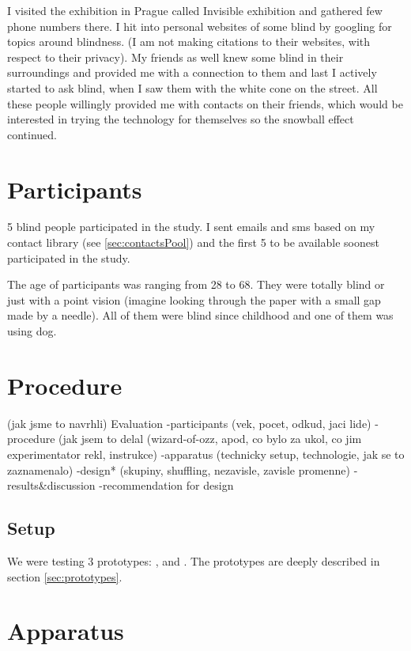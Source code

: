 \documentclass[11pt,oneside,a4paper]{book}
\begin{document}
	I visited the exhibition in Prague called Invisible exhibition \cite{later} and gathered few phone numbers there. I hit into personal websites of some blind by googling for topics around blindness. (I am not making citations to their websites, with respect to their privacy). My friends as well knew some blind in their surroundings and provided me with a connection to them and last I actively started to ask blind, when I saw them with the white cone on the street. All these people willingly provided me with contacts on their friends, which would be interested in trying the technology for themselves so the snowball effect continued.
	\section{Participants}
	
	5 blind people participated in the study. I sent emails and sms based on my contact library (see \ref{sec:contactsPool}) and the first 5 to be available soonest participated in the study. 
	
	The age of participants was ranging from 28 to 68.
	They were totally blind or just with a point vision (imagine looking through the paper with a small gap made by a needle).
	All of them were blind since childhood and one of them was using dog.
	\section{Procedure}
	(jak jsme to navrhli)
	Evaluation
	-participants (vek, pocet, odkud, jaci lide)
	-procedure (jak jsem to delal (wizard-of-ozz, apod, co bylo za ukol, co jim experimentator rekl, instrukce)
	-apparatus (technicky setup, technologie, jak se to zaznamenalo)
	-design* (skupiny, shuffling, nezavisle, zavisle promenne)
	-results\&discussion
	-recommendation for design
	
	\subsection{Setup}
	We were testing 3 prototypes: \poi{}, \reversegeo{} and \gps{}. The prototypes are deeply described in section \ref{sec:prototypes}. 
	\subsection{}
	\section{Apparatus}
\end{document}
